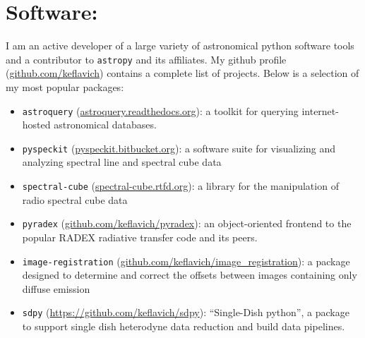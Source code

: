 \section*{Software:}
\vspace{-10pt}
I am an active developer of a large variety of astronomical python software
tools and a contributor to \texttt{astropy} and its affiliates.  My github
profile (\url{github.com/keflavich}) contains a complete list of projects.
Below is a selection of my most popular packages:
\vspace{-10pt}

\begin{itemize}
\itemsep-3pt
    \item \texttt{astroquery} (\url{astroquery.readthedocs.org}):
        a toolkit for querying internet-hosted astronomical databases.
    \item \texttt{pyspeckit} (\url{pyspeckit.bitbucket.org}): a software suite
        for visualizing and analyzing spectral line and spectral cube
        data
    \item \texttt{spectral-cube} (\url{spectral-cube.rtfd.org}): a library for the manipulation
        of radio spectral cube data
    \item \texttt{pyradex} (\url{github.com/keflavich/pyradex}):
        an object-oriented frontend to the popular RADEX radiative transfer code and
        its peers.
    \item \texttt{image-registration} (\url{github.com/keflavich/image_registration}):
        a package designed to determine and correct the offsets between images containing only
        diffuse emission
    \item \texttt{sdpy} (\url{https://github.com/keflavich/sdpy}):
        ``Single-Dish python'', a package to support single dish heterodyne data
        reduction and build data pipelines.  
\end{itemize}

